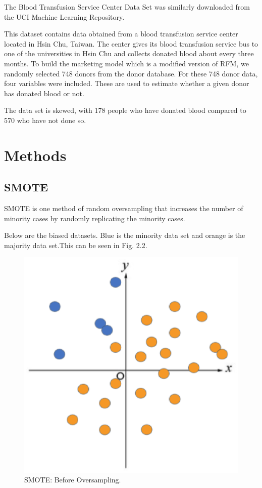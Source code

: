 The Blood Transfusion Service Center Data Set was similarly downloaded from the UCI Machine Learning Repository\cite{Blood}.

This dataset contains data obtained from a blood transfusion service center located in Hsin Chu, Taiwan.
The center gives its blood transfusion service bus to one of the universities in Hsin Chu and collects donated blood about every three months. To build the marketing model which is a modified version of RFM, we randomly selected 748 donors from the donor database. For these 748 donor data, four variables were included. These are used to estimate whether a given donor has donated blood or not.

The data set is skewed, with 178 people who have donated blood compared to 570 who have not done so.
\clearpage


\section{Methods}
\subsection{SMOTE}

SMOTE is one method of random oversampling that increases the number of minority cases by randomly replicating the minority cases\cite{SMOTE}.

Below are the biased datasets.
Blue is the minority data set and orange is the majority data set.This can be seen in Fig. 2.2.

\begin{center}
    \begin{figure}[ht]
        \caption{SMOTE: Before Oversampling.}
        \label{tab:team-rating-features}
        \begin{center}
            \includegraphics[scale=0.6]{image/smote1.eps}
        \end{center}
    \end{figure}
\end{center}

